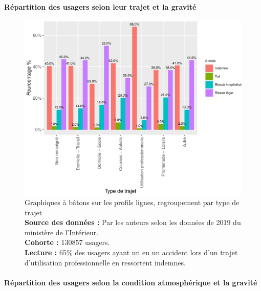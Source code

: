 \documentclass[french,]{tp}
\let\oldparagraph\paragraph
\renewcommand{\paragraph}[1]{\oldparagraph{#1}\mbox{}}
\begin{document}
\newpage

\hypertarget{ruxe9partition-des-usagers-selon-leur-trajet-et-la-gravituxe9}{%
\paragraph{Répartition des usagers selon leur trajet et la gravité}\label{ruxe9partition-des-usagers-selon-leur-trajet-et-la-gravituxe9}}






\begin{figure}[ht!]

{\centering \includegraphics{Prediction_Gravite_files/figure-latex/barplottrajet-1} 

}

\caption{Graphiques à bâtons sur les profils lignes, regroupement par type de trajet\\
\textbf{Source des données :} Par les auteurs selon les données de 2019 du ministère de l'Intérieur.\\
\textbf{Cohorte :} 130857 usagers.\\
\textbf{Lecture :} 65\% des usagers ayant un eu un accident lors d'un trajet d'utilisation professionnelle en ressortent indemnes.}\label{fig:barplottrajet}
\end{figure}

\newpage

\hypertarget{ruxe9partition-des-usagers-selon-la-condition-atmosphuxe9rique-et-la-gravituxe9}{%
\paragraph{Répartition des usagers selon la condition atmosphérique et la gravité}\label{ruxe9partition-des-usagers-selon-la-condition-atmosphuxe9rique-et-la-gravituxe9}}
\end{document}
